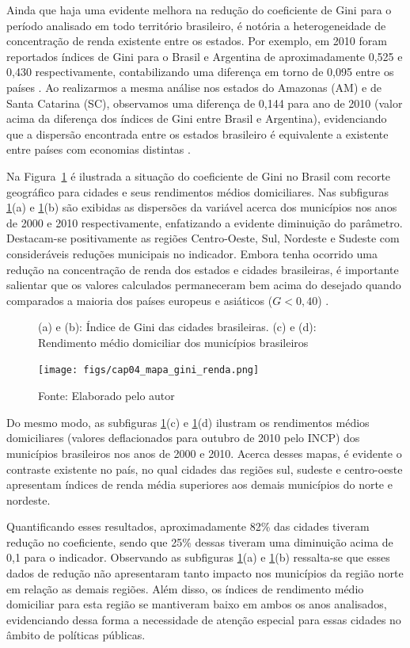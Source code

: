Ainda que haja uma evidente melhora na redução do coeficiente de Gini para o período analisado em todo território brasileiro, é notória a heterogeneidade de concentração de renda existente entre os estados. Por exemplo, em 2010 foram reportados índices de Gini para o Brasil e Argentina de aproximadamente 0,525 e 0,430 respectivamente, contabilizando uma diferença em torno de 0,095 entre os países \cite{cap04_ref1}. Ao realizarmos a mesma análise nos estados do Amazonas (AM) e de Santa Catarina (SC), observamos uma diferença de 0,144 para ano de 2010 (valor acima da diferença dos índices de Gini entre Brasil e Argentina), evidenciando que a dispersão encontrada entre os estados brasileiro é equivalente a existente entre países com economias distintas \cite{cap04_ref11}.

Na Figura~\ref{fig:cap04:ginicidades} é ilustrada a situação do coeficiente de Gini no Brasil com recorte geográfico para cidades e seus rendimentos médios domiciliares. Nas subfiguras \ref{fig:cap04:ginicidades}(a) e \ref{fig:cap04:ginicidades}(b) são exibidas as dispersões da variável acerca dos municípios nos anos de 2000 e 2010 respectivamente, enfatizando a evidente diminuição do parâmetro. Destacam-se positivamente as regiões Centro-Oeste, Sul, Nordeste e Sudeste com consideráveis reduções municipais no indicador. Embora tenha ocorrido uma redução na concentração de renda dos estados e cidades brasileiras, é importante salientar que os valores calculados permaneceram bem acima do desejado quando comparados a maioria dos países europeus e asiáticos ($G < 0,40$) \cite{cap04_ref1}.

\begin{figure}[!ht]
    \centering
    \caption{(a) e (b): Índice de Gini das cidades brasileiras. (c) e (d): Rendimento médio domiciliar dos municípios brasileiros}
    \texttt{[image: figs/cap04\_mapa\_gini\_renda.png]}
    \caption*{\footnotesize{Fonte: Elaborado pelo autor}}
    \label{fig:cap04:ginicidades}
\end{figure}

Do mesmo modo, as subfiguras \ref{fig:cap04:ginicidades}(c) e \ref{fig:cap04:ginicidades}(d) ilustram os rendimentos médios domiciliares (valores deflacionados para outubro de 2010 pelo INCP) dos municípios brasileiros nos anos de 2000 e 2010. Acerca desses mapas, é evidente o contraste existente no país, no qual cidades das regiões sul, sudeste e centro-oeste apresentam índices de renda média superiores aos demais municípios do norte e nordeste. 

Quantificando esses resultados, aproximadamente 82\% das cidades tiveram redução no coeficiente, sendo que 25\% dessas tiveram uma diminuição acima de 0,1 para o indicador. Observando as subfiguras \ref{fig:cap04:ginicidades}(a) e \ref{fig:cap04:ginicidades}(b) ressalta-se que esses dados de redução não apresentaram tanto impacto nos municípios da região norte em relação as demais regiões. Além disso, os índices de rendimento médio domiciliar para esta região se mantiveram baixo em ambos os anos analisados, evidenciando dessa forma a necessidade de atenção especial para essas cidades no âmbito de políticas públicas.

